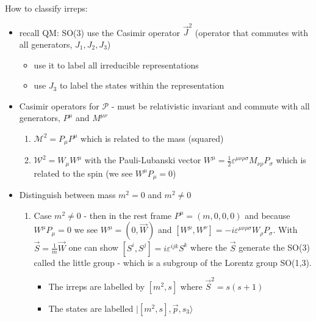 \documentclass[10pt,a4paper]{book}
\theoremstyle{definition}
\begin{document}
How to classify irreps:
\begin{itemize}
\item recall QM: SO(3) use the Casimir operator $\vec{J}^2$ (operator that commutes with all generators, $J_1, J_2, J_3$) 
\begin{itemize}
\item use it to label all irreducible representations
\item use $J_3$ to label the states within the representation
\end{itemize}  
\item Casimir operators for $\mathcal{P}$ - must be relativistic invariant and commute with all generators, $P^\mu$ and $M^{\mu\nu}$
\begin{enumerate}
\item $\mathcal{M}^2=P_\mu P^\mu$ which is related to the mass (squared)
\item $\mathcal{W}^2=W_\mu W^{\mu}$ with the Pauli-Lubanski vector $W^\mu=\frac{1}{2}\varepsilon^{\mu\nu\rho\sigma}M_{\nu\rho}P_\sigma$ which is related to the spin (we see $W^\mu P_\mu=0$)
\end{enumerate}
\item Distinguish between mass $m^2=0$ and $m^2\neq0$
\begin{enumerate}
\item Case $m^2\neq0$ - then in the rest frame $P^\mu=(m,0,0,0)$ and because $W^\mu P_\mu=0$ we see $W^\mu=(0,\vec{W})$ and $[W^\mu,W^\nu]=-i\varepsilon^{\mu\nu\rho\sigma}W_\rho P_\sigma$. With $\vec{S}=\frac{1}{m}\vec{W}$ one can show $[S^i,S^j]=i\varepsilon^{ijk}S^k$ where the $\vec{S}$ generate the SO(3) called the little group - which is a subgroup of the Lorentz group SO(1,3).
\begin{itemize}
\item The irreps are labelled by $[m^2,s]$ where $\vec{S}^2=s(s+1)$
\item The states are labelled $|[m^2,s],\vec{p},s_3\rangle$
\end{itemize} 



\end{enumerate}
\end{itemize}
\end{document}
